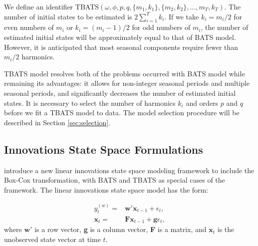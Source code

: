 \documentclass{uwstat572}
\begin{document}
We define an identifier TBATS$( \omega, \phi, p, q, \{m_1,k_1\}, \{m_2,k_2\},...,{m_T,k_T} )$. The number of initial states to be estimated is $2\sum\limits_{i=1}^T k_i$. If we take $k_i=m_i/2$ for even numbers of $m_i$ or $k_i=(m_i-1)/2$ for odd numbers of $m_i$, the number of estimated initial states will be approximately equal to that of BATS model. However, it is anticipated that most seasonal components require fewer than $m_i/2$ harmonics. 

TBATS model resolves both of the problems occurred with BATS model while remaining its advantages: it allows for non-integer seasonal periods and multiple seasonal periods, and significantly decreases the number of estimated initial states. It is necessary to select the number of harmonics $k_i$ and orders $p$ and $q$ before we fit a TBATS model to data. The model selection procedure will be described in Section \ref{sec:selection}.

\subsection{Innovations State Space Formulations}
\citet{de2011forecasting} introduce a new linear innovations state space modeling framework to include the Box-Cox transformation, with BATS and TBATS as special cases of the framework. The linear innovations state space model has the form:

\begin{subequations}
\begin{align}
y_t^{  (w)}=&\textbf{w}'\textbf{x}_{t-1}+\epsilon_t, \\
\textbf{x}_t=&\textbf{Fx}_{t-1}+\textbf{g}\epsilon_t,
\end{align}
\end{subequations}
\noindent where $\textbf{w}'$ is a row vector, \textbf{g} is a column vector, \textbf{F} is a matrix, and $\textbf{x}_t$ is the unobserved state vector at time $t$.
\end{document}

